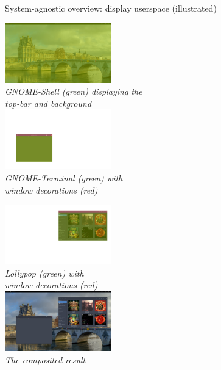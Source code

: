 \begin{frame}{System-agnostic overview: display userspace (illustrated)}

  \begin{minipage}[t]{0.49\textwidth}
    \centering
    \includegraphics[height=7em]{slides/graphics-introduction/compositing-gnome-shell.jpg}\\
    \textit{\small GNOME-Shell (green) displaying the\\ top-bar and background}\\
    \vspace{0.5em}
    \includegraphics[height=7em]{slides/graphics-introduction/compositing-gnome-terminal.jpg}\\
    \textit{\small GNOME-Terminal (green) with\\ window decorations (red)}
  \end{minipage}
  \hfill
  \begin{minipage}[t]{0.49\textwidth}
    \centering
    \includegraphics[height=7em]{slides/graphics-introduction/compositing-lollypop.jpg}\\
    \textit{\small Lollypop (green) with\\ window decorations (red)}\\
    \vspace{0.5em}
    \includegraphics[height=7em]{slides/graphics-introduction/compositing-result.jpg}\\
    \textit{\small The composited result}
  \end{minipage}
\end{frame}

